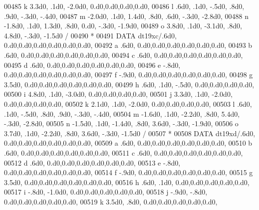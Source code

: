 \begin{DoxyCode}
00485      k           3.3d0,   .1d0, -2.0d0,             0.d0,0.d0,0.d0,0.d0,
00486      l            .6d0,   .1d0,  -.5d0,   .8d0,   .9d0,  -.3d0,  -.4d0,
00487      m          -2.0d0,   .1d0,  1.4d0,   .8d0,   .6d0,  -.3d0, -2.8d0,
00488      n          -1.8d0,   .1d0,  1.3d0,   .8d0,  0.d0,   -.3d0, -1.9d0,
00489      o           3.8d0,   .1d0, -3.1d0,   .8d0,  4.8d0,  -.3d0, -1.5d0 /
00490 \textcolor{comment}{*}
00491       \textcolor{keyword}{DATA} dt19xc/.6d0,                  0.d0,0.d0,0.d0,0.d0,0.d0,0.d0,
00492      a            .6d0,                  0.d0,0.d0,0.d0,0.d0,0.d0,0.d0,
00493      b            .6d0,                  0.d0,0.d0,0.d0,0.d0,0.d0,0.d0,
00494      c            .6d0,                  0.d0,0.d0,0.d0,0.d0,0.d0,0.d0,
00495      d            .6d0,                  0.d0,0.d0,0.d0,0.d0,0.d0,0.d0,
00496      e           -.8d0,                  0.d0,0.d0,0.d0,0.d0,0.d0,0.d0,
00497      f           -.9d0,                  0.d0,0.d0,0.d0,0.d0,0.d0,0.d0,
00498      g           3.5d0,                  0.d0,0.d0,0.d0,0.d0,0.d0,0.d0,
00499      h            .6d0,   .1d0,  -.5d0,             0.d0,0.d0,0.d0,0.d0,
00500      i           4.8d0,   .1d0, -3.0d0,             0.d0,0.d0,0.d0,0.d0,
00501      j           3.3d0,   .1d0, -2.0d0,             0.d0,0.d0,0.d0,0.d0,
00502      k           2.1d0,   .1d0, -2.0d0,             0.d0,0.d0,0.d0,0.d0,
00503      l            .6d0,   .1d0,  -.5d0,   .8d0,   .9d0,  -.3d0,  -.4d0,
00504      m          -1.6d0,   .1d0, -2.2d0,   .8d0,  5.4d0,  -.3d0, -2.8d0,
00505      n          -1.5d0,   .1d0, -1.4d0,   .8d0,  3.6d0,  -.3d0, -1.9d0,
00506      o           3.7d0,   .1d0, -2.2d0,   .8d0,  3.6d0,  -.3d0, -1.5d0 /
00507 \textcolor{comment}{*}
00508       \textcolor{keyword}{DATA} dt19xd/.6d0,                  0.d0,0.d0,0.d0,0.d0,0.d0,0.d0,
00509      a            .6d0,                  0.d0,0.d0,0.d0,0.d0,0.d0,0.d0,
00510      b            .6d0,                  0.d0,0.d0,0.d0,0.d0,0.d0,0.d0,
00511      c            .6d0,                  0.d0,0.d0,0.d0,0.d0,0.d0,0.d0,
00512      d            .6d0,                  0.d0,0.d0,0.d0,0.d0,0.d0,0.d0,
00513      e           -.8d0,                  0.d0,0.d0,0.d0,0.d0,0.d0,0.d0,
00514      f           -.9d0,                  0.d0,0.d0,0.d0,0.d0,0.d0,0.d0,
00515      g           3.5d0,                  0.d0,0.d0,0.d0,0.d0,0.d0,0.d0,
00516      h            .6d0,   .1d0,             0.d0,0.d0,0.d0,0.d0,0.d0,
00517      i           -.8d0, -1.0d0,             0.d0,0.d0,0.d0,0.d0,0.d0,
00518      j           -.9d0,  -.8d0,             0.d0,0.d0,0.d0,0.d0,0.d0,
00519      k           3.5d0,   .8d0,             0.d0,0.d0,0.d0,0.d0,0.d0,

\end{DoxyCode}
